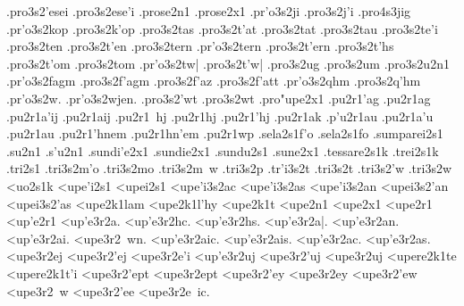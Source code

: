 {	.pro3s2'esei
	.pro3s2ese'i
.prose2n1 		%
.prose2x1 		%
	.pr'o3s2ji 		%
	.pro3s2j'i
		.pro4s3jig 		%
	.pr'o3s2kop 		%
	.pro3s2k'op
	.pro3s2tas 		%
	.pro3s2t'at 		%
	.pro3s2tat 		%
	.pro3s2tau 		%
	.pro3s2te'i 		%
	.pro3s2ten 		%
	.pro3s2t'en 		%
	.pro3s2tern 		%
	.pr'o3s2tern 		%
	.pro3s2t'ern
	.pro3s2t'hs 		%
	.pro3s2t'om 		%
	.pro3s2tom
	.pr'o3s2tw|		%
	.pro3s2t'w|
	.pro3s2ug 		%
	.pro3s2um 		%
	.pro3s2u2n1 		%
	.pr'o3s2fagm 		%
	.pro3s2f'agm
	.pro3s2f'az 		%
	.pro3s2f'att 		%
	.pr'o3s2qhm 		%
	.pro3s2q'hm
	.pr'o3s2w.
	.pr'o3s2wjen.
	.pro3s2'wt 		%
	.pro3s2wt
.pro"upe2x1 		%
.pu2r1'ag		%
.pu2r1ag
.pu2r1a'ij   		%
.pu2r1aij		%
.pu2r1~hj 		%
.pu2r1hj 		%
.pu2r1'hj 		%
.pu2r1ak   		%
.p'u2r1au		%
.pu2r1a'u
.pu2r1au 		%
.pu2r1'hnem 		%
.pu2r1hn'em
.pu2r1wp 		%
.sela2s1f'o		%
.sela2s1fo
.sumparei2s1 		%
.su2n1
.s'u2n1	   		%
.sundi'e2x1 		%
.sundie2x1 		%
.sundu2s1 		%
.sune2x1 		%
.tessare2s1k 		%
.trei2s1k 		%
.tri2s1
	.tri3s2m'o 		%
	.tri3s2mo
	.tri3s2m~w
	.tri3s2p 		%
	.tr'i3s2t 		%
	.tri3s2t
	.tri3s2'w 		%
	.tri3s2w
<uo2s1k 		%
<upe'i2s1
<upei2s1
	<upe'i3s2ac 		%
	<upe'i3s2as
	<upe'i3s2an
	<upei3s2'an
	<upei3s2'as
<upe2k1lam  		%
<upe2k1l'hy  		%
<upe2k1t    		%
<upe2n1
<upe2x1
<upe2r1
<up'e2r1
	<up'e3r2a.		%
	<up'e3r2hc.
	<up'e3r2hs.
	<up'e3r2a|.
	<up'e3r2an.
	<up'e3r2ai.
	<upe3r2~wn.
	<up'e3r2aic.
	<up'e3r2ais.
	<up'e3r2ac.
	<up'e3r2as.
	<upe3r2ej		%
	<upe3r2'ej
	<upe3r2e'i		%
	<up'e3r2uj		%
	<upe3r2'uj
	<upe3r2uj		%
<upere2k1te 		%
<upere2k1t'i 		%
	<upe3r2'ept 		%
	<upe3r2ept
	<upe3r2'ey
	<upe3r2ey
	<upe3r2'ew 		%
	<upe3r2~w
	<upe3r2'ee
	<upe3r2e~ic.
}
